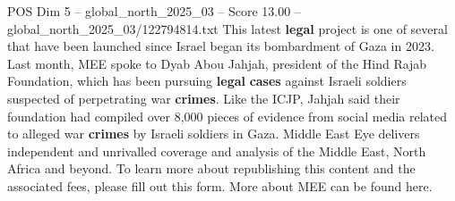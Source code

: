 \begin{textsample}{POS Dim 5 – global\_north\_2025\_03 – Score 13.00 – global\_north\_2025\_03/122794814.txt}
This latest \textbf{legal} project is one of several that have been launched since Israel began its bombardment of Gaza in 2023.
Last month, MEE spoke to Dyab Abou Jahjah, president of the Hind Rajab Foundation, which has been pursuing \textbf{legal} \textbf{cases} against Israeli soldiers suspected of perpetrating war \textbf{crimes}.
Like the ICJP, Jahjah said their foundation had compiled over 8,000 pieces of evidence from social media related to alleged war \textbf{crimes} by Israeli soldiers in Gaza.
Middle East Eye delivers independent and unrivalled coverage and analysis of the Middle East, North Africa and beyond.
To learn more about republishing this content and the associated fees, please fill out this form.
More about MEE can be found here.

\end{textsample}
